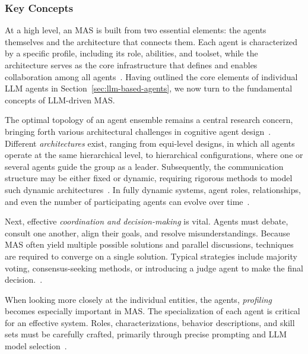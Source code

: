 \documentclass[pdflatex,sn-mathphys-num]{sn-jnl}%
\theoremstyle{thmstyleone}%
\theoremstyle{thmstyletwo}%
\theoremstyle{thmstylethree}%
\begin{document}
\subsubsection{Key Concepts}

At a high level, an MAS is built from two essential elements: the agents themselves and the architecture that connects them. Each agent is characterized by a specific profile, including its role, abilities, and toolset, while the architecture serves as the core infrastructure that defines and enables collaboration among all agents~\cite{li2024survey,yan2025beyond}. Having outlined the core elements of individual LLM agents in Section~\ref{sec:llm-based-agents}, we now turn to the fundamental concepts of LLM-driven MAS.

The optimal topology of an agent ensemble remains a central research concern, bringing forth various architectural challenges in cognitive agent design~\cite{gidey2023towards}. 
Different \textit{architectures} exist, ranging from equi-level designs, in which all agents operate at the same hierarchical level, to hierarchical configurations, where one or several agents guide the group as a leader. 
Subsequently, the communication structure may be either fixed or dynamic, requiring rigorous methods to model such dynamic architectures~\cite{gidey2019modeling}. 
In fully dynamic systems, agent roles, relationships, and even the number of participating agents can evolve over time~\cite{han2024llm,masterman2024landscape,tillmann2025literature}.

Next, effective \textit{coordination and decision-making} is vital. Agents must debate, consult one another, align their goals, and resolve misunderstandings. Because MAS often yield multiple possible solutions and parallel discussions, techniques are required to converge on a single solution. Typical strategies include majority voting, consensus-seeking methods, or introducing a judge agent to make the final decision.~\cite{kaesberg2025voting,huang2024understanding}.

When looking more closely at the individual entities, the agents, \textit{profiling} becomes especially important in MAS. The specialization of each agent is critical for an effective system. Roles, characterizations, behavior descriptions, and skill sets must be carefully crafted, primarily through precise prompting and LLM model selection~\cite{wang2024survey,guo2026embodied,li2023camelcommunicativeagentsmind}. 
\end{document}
